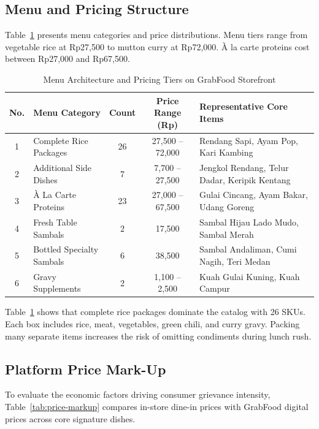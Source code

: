 \documentclass{jomas}
\begin{document}
\subsection{Menu and Pricing Structure}
Table~\ref{tab:menu-pricing} presents menu categories and price distributions. Menu tiers range from vegetable rice at Rp27,500 to mutton curry at Rp72,000. À la carte proteins cost between Rp27,000 and Rp67,500.

\begin{table}[H]
\caption{Menu Architecture and Pricing Tiers on GrabFood Storefront}
\label{tab:menu-pricing}
\centering
\small
\begin{tabularx}{\textwidth}{c l c c X}
\toprule
\textbf{No.} & \textbf{Menu Category} & \textbf{Count} & \textbf{Price Range (Rp)} & \textbf{Representative Core Items} \\
\midrule
1 & Complete Rice Packages & 26 & 27,500 -- 72,000 & Rendang Sapi, Ayam Pop, Kari Kambing \\
2 & Additional Side Dishes & 7 & 7,700 -- 27,500 & Jengkol Rendang, Telur Dadar, Keripik Kentang \\
3 & À La Carte Proteins & 23 & 27,000 -- 67,500 & Gulai Cincang, Ayam Bakar, Udang Goreng \\
4 & Fresh Table Sambals & 2 & 17,500 & Sambal Hijau Lado Mudo, Sambal Merah \\
5 & Bottled Specialty Sambals & 6 & 38,500 & Sambal Andaliman, Cumi Nagih, Teri Medan \\
6 & Gravy Supplements & 2 & 1,100 -- 2,500 & Kuah Gulai Kuning, Kuah Campur \\
\bottomrule
\end{tabularx}
\end{table}

Table~\ref{tab:menu-pricing} shows that complete rice packages dominate the catalog with 26 SKUs. Each box includes rice, meat, vegetables, green chili, and curry gravy. Packing many separate items increases the risk of omitting condiments during lunch rush.

\subsection{Platform Price Mark-Up}
To evaluate the economic factors driving consumer grievance intensity, Table~\ref{tab:price-markup} compares in-store dine-in prices with GrabFood digital prices across core signature dishes.
\end{document}
